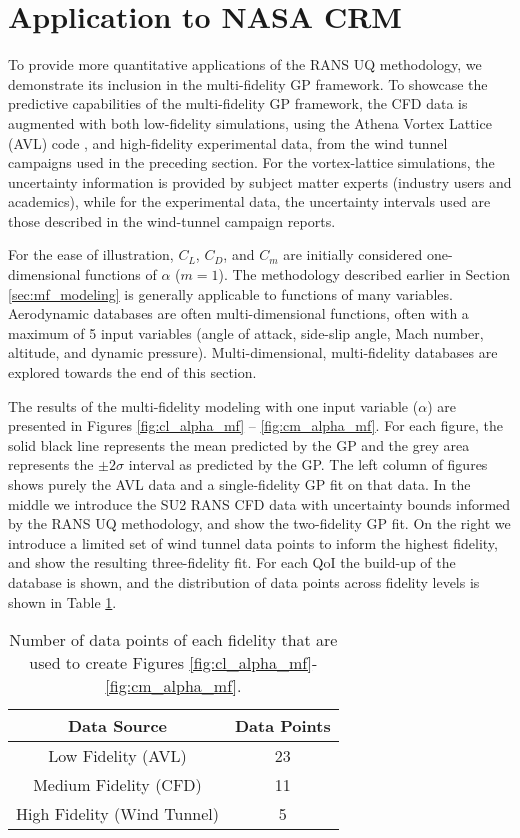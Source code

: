 \section{Application to NASA CRM} \label{sec:mf_gp_nasa_crm}

To provide more quantitative applications of the RANS UQ methodology, we demonstrate its inclusion in the multi-fidelity GP framework. To showcase the predictive capabilities of the multi-fidelity GP framework, the CFD data is augmented with both low-fidelity simulations, using the Athena Vortex Lattice (AVL) code \cite{drela2008athena}, and high-fidelity experimental data, from the wind tunnel campaigns \cite{rivers_further_2012,rivers_experimental_2010} used in the preceding section. For the vortex-lattice simulations, the uncertainty information is provided by subject matter experts (industry users and academics), while for the experimental data, the uncertainty intervals used are those described in the wind-tunnel campaign reports. 

For the ease of illustration, $C_L$, $C_D$, and $C_m$ are initially considered one-dimensional functions of $\alpha$ ($m = 1$). The methodology described earlier in Section \ref{sec:mf_modeling} is generally applicable to functions of many variables. Aerodynamic databases are often multi-dimensional functions, often with a maximum of 5 input variables (angle of attack, side-slip angle, Mach number, altitude, and dynamic pressure). Multi-dimensional, multi-fidelity databases are explored towards the end of this section. 

The results of the multi-fidelity modeling with one input variable ($\alpha$) are presented in Figures \ref{fig:cl_alpha_mf} -- \ref{fig:cm_alpha_mf}. For each figure, the solid black line represents the mean predicted by the GP and the grey area represents the $\pm 2\sigma$ interval as predicted by the GP. The left column of figures shows purely the AVL data and a single-fidelity GP fit on that data. In the middle we introduce the SU2 RANS CFD data with uncertainty bounds informed by the RANS UQ methodology, and show the two-fidelity GP fit. On the right we introduce a limited set of wind tunnel data points to inform the highest fidelity, and show the resulting three-fidelity fit. For each QoI the build-up of the database is shown, and the distribution of data points across fidelity levels is shown in Table \ref{table:data_points}.

\begin{table}
\centering
    \captionsetup{justification=centering}
    \caption{Number of data points of each fidelity that are used to create Figures \ref{fig:cl_alpha_mf}-\ref{fig:cm_alpha_mf}.} 
    \begin{tabular}{|c|c|}
        \hline
        Data Source & Data Points \\ \hline \hline
        Low Fidelity (AVL) & 23 \\ \hline
        Medium Fidelity (CFD) & 11 \\ \hline 
        High Fidelity (Wind Tunnel) & 5 \\ \hline 
    \end{tabular}
    \label{table:data_points}
\end{table}


